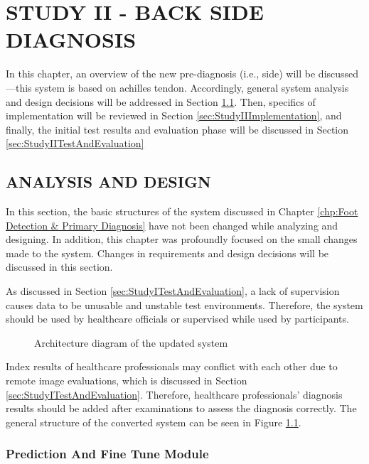 \chapter{STUDY II - BACK SIDE DIAGNOSIS}\label{chp:Back Side Diagnosis}

In this chapter, an overview of the new pre-diagnosis (i.e., side) will be discussed—this system is based on achilles tendon. Accordingly, general system analysis and design decisions will be addressed in Section \ref{sec:StudyIIAnalysisAndDesign}. Then, specifics of implementation will be reviewed in Section \ref{sec:StudyIIImplementation}, and finally, the initial test results and evaluation phase will be discussed in Section \ref{sec:StudyIITestAndEvaluation}

\section{ANALYSIS AND DESIGN} \label{sec:StudyIIAnalysisAndDesign}

In this section, the basic structures of the system discussed in Chapter \ref{chp:Foot Detection & Primary Diagnosis} have not been changed while analyzing and designing. In addition, this chapter was profoundly focused on the small changes made to the system. Changes in requirements and design decisions will be discussed in this section.

As discussed in Section \ref{sec:StudyITestAndEvaluation}, a lack of supervision causes data to be unusable and unstable test environments. Therefore, the system should be used by healthcare officials or supervised while used by participants.

\begin{figure}[htbp]
\centering
{}
\caption{Architecture diagram of the updated system}
\label{fig:GeneralArchitectureDiagramPartI}
\end{figure}

Index results of healthcare professionals may conflict with each other due to remote image evaluations, which is discussed in Section \ref{sec:StudyITestAndEvaluation}. Therefore, healthcare professionals’ diagnosis results should be added after examinations to assess the diagnosis correctly. The general structure of the converted system can be seen in Figure \ref{fig:GeneralArchitectureDiagramPartI}.

\subsection{ Prediction And Fine Tune Module }

